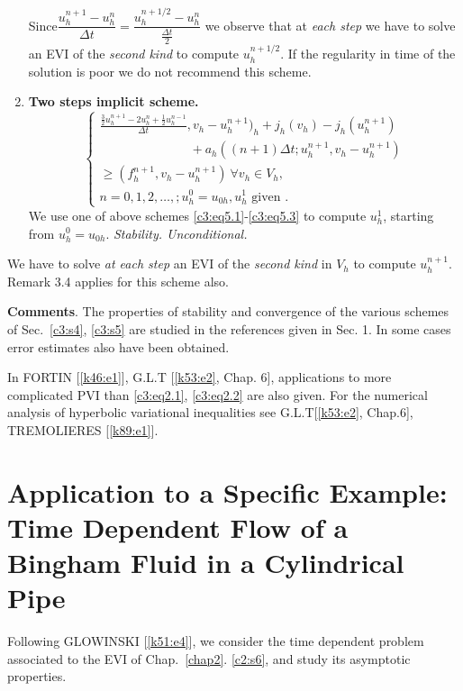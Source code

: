 \begin{enumerate}
Since\pageoriginale  $\dfrac{u^{n+1}_h - u^n_h} {\Delta  t} = \dfrac{u^{n+1/2}_h -u^n_h}{\frac{\Delta  t}{2}}$ we observe that at \textit {each step} we have to solve an EVI of the \textit {second kind} to compute $u^{n+1/2}_h$. If the regularity in time of the solution is poor we do not recommend this scheme.

\item {\bf Two steps implicit scheme.}
\begin{equation}
\begin{cases}
  \frac{\frac{3}{2} u^{n+1}_h - 2u_h^n +\frac{1}{2} u^{n-1}_h }{\Delta
    t}, v_h -u^{n+1}_h )_h +j_h (v_h)-j_h  (u^{n+1}_h)\\ 
  \hspace{3cm}+ a_h ((n+1)
  \Delta  t; u^{n+1}_h, v_h -u^{n+1}_h)  \\ 
  \geq (f^{n+1}_h, v_h -u^{n+1}_h) \ \forall v_h \in V_h,\\
  n = 0, 1, 2, \ldots, ; u^0_h = u_{0h}, u^1_h \text { given
  }.\tag{5.4}\label{c3:eq5.4} 
\end{cases}
\end{equation}
We use one of above schemes \eqref{c3:eq5.1}-\eqref{c3:eq5.3} to
compute $u^1_h$, starting from $u^0_h = u_{0h}$. \textit
{Stability. Unconditional.} 
\end{enumerate}

We have to solve \textit {at each step} an EVI of the \textit{second kind} in $V_h$ to compute $u^{n+1}_h$. Remark 3.4 applies for this scheme also.

\textbf {Comments}. The properties of stability and convergence of the
various schemes of Sec.~\ref{c3:s4},  
\ref{c3:s5} are studied in the references given in Sec. 1. In some
cases error estimates also have been obtained. 

In FORTIN [\ref{k46:e1}], G.L.T [\ref{k53:e2}, Chap. 6], applications
to more complicated 
PVI than \eqref{c3:eq2.1}, \eqref{c3:eq2.2} are also given. For the
numerical analysis of hyperbolic variational inequalities see
G.L.T[\ref{k53:e2},  Chap.6],  TREMO\-LIERES [\ref{k89:e1}]. 


\section[Application to a Specific Example:...]{Application to a
  Specific Example: Time Dependent Flow of a Bingham Fluid in a
  Cylindrical Pipe}\label{c3:s6} 

Following  GLOWINSKI [\ref{k51:e4}], we consider the time dependent
problem associated to the EVI of Chap.~\ref{chap2}. \ref{c2:s6}, and
study its asymptotic properties.  

